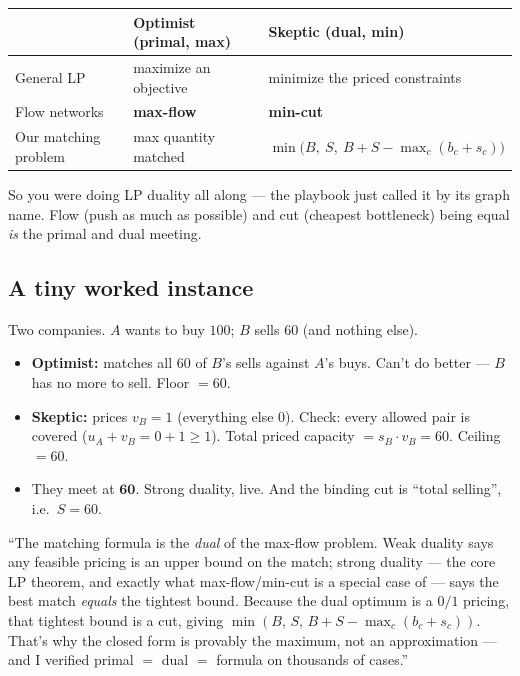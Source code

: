 \begin{center}
\renewcommand{\arraystretch}{1.4}
\begin{tabular}{@{}lll@{}}
\toprule
 & \textbf{Optimist (primal, max)} & \textbf{Skeptic (dual, min)} \\
\midrule
General LP & maximize an objective & minimize the priced constraints \\
Flow networks & \textbf{max-flow} & \textbf{min-cut} \\
Our matching problem & max quantity matched & $\min\big(B,\ S,\ B+S-\max_c(b_c+s_c)\big)$ \\
\bottomrule
\end{tabular}
\end{center}

So you were doing LP duality all along --- the playbook just called it by its
graph name. Flow (push as much as possible) and cut (cheapest bottleneck) being
equal \emph{is} the primal and dual meeting.

\subsection{A tiny worked instance}

Two companies. $A$ wants to buy $100$; $B$ sells $60$ (and nothing else).
\begin{itemize}[leftmargin=1.5em,nosep]
  \item \textbf{Optimist:} matches all $60$ of $B$'s sells against $A$'s buys.
        Can't do better --- $B$ has no more to sell. Floor $=60$.
  \item \textbf{Skeptic:} prices $v_B=1$ (everything else $0$). Check: every
        allowed pair is covered ($u_A+v_B=0+1\ge1$). Total priced capacity
        $=s_B\cdot v_B=60$. Ceiling $=60$.
  \item They meet at $\mathbf{60}$. Strong duality, live. And the binding cut is
        ``total selling'', i.e.\ $S=60$.
\end{itemize}

\begin{say}
``The matching formula is the \emph{dual} of the max-flow problem. Weak duality
says any feasible pricing is an upper bound on the match; strong duality --- the
core LP theorem, and exactly what max-flow/min-cut is a special case of --- says
the best match \emph{equals} the tightest bound. Because the dual optimum is a
$0/1$ pricing, that tightest bound is a cut, giving
$\min(B,\,S,\,B+S-\max_c(b_c+s_c))$. That's why the closed form is provably the
maximum, not an approximation --- and I verified primal $=$ dual $=$ formula on
thousands of cases.''
\end{say}
